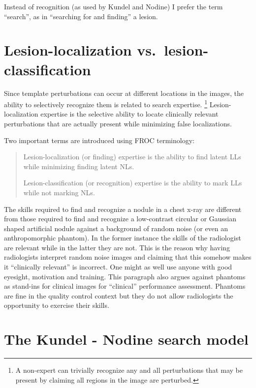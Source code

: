 \documentclass[
]{book}
\begin{document}
Instead of recognition (as used by Kundel and Nodine) I prefer the term ``search'', as in ``searching for and finding'' a lesion.

\hypertarget{visual-search-search-classification}{%
\section{Lesion-localization vs.~lesion-classification}\label{visual-search-search-classification}}

Since template perturbations can occur at different locations in the images, the ability to selectively recognize them is related to search expertise. \footnote{A non-expert can trivially recognize any and all perturbations that may be present by claiming all regions in the image are perturbed.} Lesion-localization expertise is the selective ability to locate clinically relevant perturbations that are actually present while minimizing false localizations.

Two important terms are introduced using FROC terminology:

\begin{quote}
Lesion-localization (or finding) expertise is the ability to find latent LLs while minimizing finding latent NLs.

Lesion-classification (or recognition) expertise is the ability to mark LLs while not marking NLs.
\end{quote}

The skills required to find and recognize a nodule in a chest x-ray are different from those required to find and recognize a low-contrast circular or Gaussian shaped artificial nodule against a background of random noise (or even an anthropomorphic phantom). In the former instance the skills of the radiologist are relevant while in the latter they are not. This is the reason why having radiologists interpret random noise images and claiming that this somehow makes it ``clinically relevant'' is incorrect. One might as well use anyone with good eyesight, motivation and training. This paragraph also argues against phantoms as stand-ins for clinical images for ``clinical'' performance assessment. Phantoms are fine in the quality control context but they do not allow radiologists the opportunity to exercise their skills.

\hypertarget{visual-search-kundel-nodine-model}{%
\section{The Kundel - Nodine search model}\label{visual-search-kundel-nodine-model}}
\end{document}
